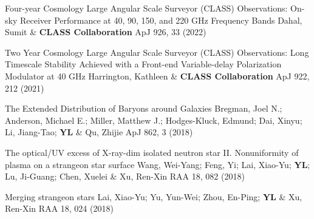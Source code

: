 \begin{etaremune}[topsep=0pt,itemsep=0pt,partopsep=0pt,parsep=0pt]
            {Four-year Cosmology Large Angular Scale Surveyor (CLASS) Observations: On-sky Receiver Performance at 40, 90, 150, and 220 GHz Frequency Bands}
            {Dahal, Sumit \& \textbf{CLASS Collaboration}}
            {ApJ 926, 33 (2022)}
    
            {Two Year Cosmology Large Angular Scale Surveyor (CLASS) Observations: Long Timescale Stability Achieved with a Front-end Variable-delay Polarization Modulator at 40 GHz}
            {Harrington, Kathleen \& \textbf{CLASS Collaboration}}
            {ApJ 922, 212 (2021)}
    
            {The Extended Distribution of Baryons around Galaxies}
            {Bregman, Joel N.; Anderson, Michael E.; Miller, Matthew J.; Hodges-Kluck, Edmund; Dai, Xinyu; Li, Jiang-Tao; \textbf{YL} \& Qu, Zhijie}
            {ApJ 862, 3 (2018)}
    
            {The optical/UV excess of X-ray-dim isolated neutron star II. Nonuniformity of plasma on a strangeon star surface}
            {Wang, Wei-Yang; Feng, Yi; Lai, Xiao-Yu; \textbf{YL}; Lu, Ji-Guang; Chen, Xuelei \& Xu, Ren-Xin}
            {RAA 18, 082 (2018)}
    
            {Merging strangeon stars}
            {Lai, Xiao-Yu; Yu, Yun-Wei; Zhou, En-Ping; \textbf{YL} \& Xu, Ren-Xin}
            {RAA 18, 024 (2018)}
    
\end{etaremune}
